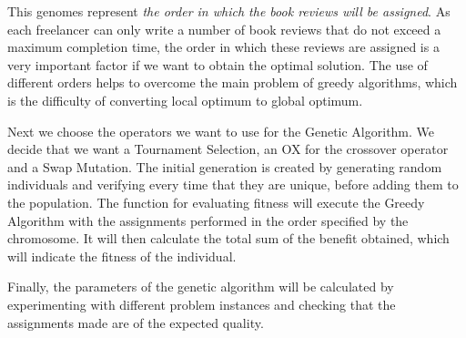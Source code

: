 This genomes represent \textit{the order in which the book reviews will be assigned}. As each freelancer can only write a number of book reviews that do not exceed a maximum completion time, the order in which these reviews are assigned is a very important factor if we want to obtain the optimal solution. The use of different orders helps to overcome the main problem of greedy algorithms, which is the difficulty of converting local optimum to global optimum.

Next we choose the operators we want to use for the Genetic Algorithm. We decide that we want a Tournament Selection, an OX for the crossover operator and a Swap Mutation. The initial generation is created by generating random individuals and verifying every time that they are unique, before adding them to the population. The function for evaluating fitness will execute the Greedy Algorithm with the assignments performed in the order specified by the chromosome. It will then calculate the total sum of the benefit obtained, which will indicate the fitness of the individual.

Finally, the parameters of the genetic algorithm will be calculated by experimenting with different problem instances and checking that the assignments made are of the expected quality.

